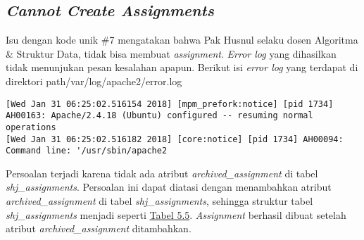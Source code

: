 	\subsection{\textit{Cannot Create Assignments}}
	Isu dengan kode unik \#7 mengatakan bahwa Pak Husnul selaku dosen Algoritma \& Struktur Data, tidak bisa membuat \textit{assignment}.\textit{ Error log} yang dihasilkan tidak menunjukan pesan kesalahan apapun. 
	Berikut isi \textit{error log} yang terdapat di direktori path{/var/log/apache2/error.log}
\begin{lstlisting}[basicstyle=\ttfamily, frame=single,columns=fullflexible, keepspaces=true, breaklines=true]
[Wed Jan 31 06:25:02.516154 2018] [mpm_prefork:notice] [pid 1734] AH00163: Apache/2.4.18 (Ubuntu) configured -- resuming normal operations
[Wed Jan 31 06:25:02.516182 2018] [core:notice] [pid 1734] AH00094: Command line: '/usr/sbin/apache2
\end{lstlisting}
	
	Persoalan terjadi karena tidak ada atribut \textit{archived\_assignment} di tabel \textit{shj\_assignments}. Persoalan ini dapat diatasi dengan menambahkan atribut \textit{archived\_assignment} di tabel \textit{shj\_assignments}, sehingga struktur tabel \textit{shj\_assignments} menjadi seperti \hyperref[tab:atributtabelassignments]{Tabel 5.5}. \textit{Assignment} berhasil dibuat setelah atribut \textit{archived\_assignment} ditambahkan.
	
